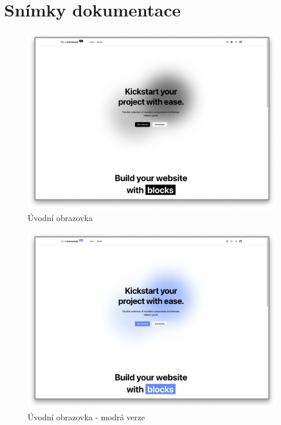\chapter{Snímky dokumentace}

\begin{figure}[h]
  \includegraphics[width=\textwidth]{images/landing-page}
  \caption{Úvodní obrazovka} \label{picture:documentation:landing-page}
\end{figure}

\begin{figure}[h]
  \includegraphics[width=\textwidth]{images/landing-page-blue}
  \caption{Úvodní obrazovka - modrá verze} \label{picture:documentation:landing-page-blue}
\end{figure}

